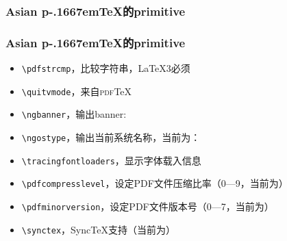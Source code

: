 \documentclass[dvipdfmx]{beamer}
\newcommand{\pTeX}{p\kern-.1667em\TeX}
\newcommand{\ptexng}{Asian \pTeX}
\begin{document}
%
\begin{frame}[fragile]
\frametitle{\ptexng 的primitive}
\end{frame}
%
\begin{frame}[fragile]
\frametitle{\ptexng 的primitive}
\begin{itemize}
\item \verb!\pdfstrcmp!，比较字符串，\LaTeX3必须
\item \verb!\quitvmode!，来自\textsc{pdf}\TeX
\item \verb!\ngbanner!，输出banner: \ngbanner
\item \verb!\ngostype!，输出当前系统名称，当前为：\ngostype
\item \verb!\tracingfontloaders!，显示字体载入信息
\item \verb!\pdfcompresslevel!，设定PDF文件压缩比率（0—9，当前为{\the\pdfcompresslevel}）
\item \verb!\pdfminorversion!，设定PDF文件版本号（0—7，当前为{\the\pdfminorversion}）
\item \verb!\synctex!，Sync\TeX 支持（当前为{\the\synctex}）
\end{itemize}
\end{frame}
%
\end{document}
